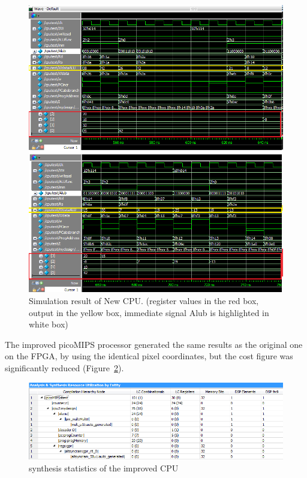 \begin{figure}[H]
		\centering
		\includegraphics[width = \textwidth]{Figures/icputest_2}		
		\caption{Simulation result of New CPU. (register values in the red box, output in the yellow box, immediate signal Alub is highlighted in white box)}
		\label {fig:icputest}
\end{figure}

The improved picoMIPS processor generated the same results as the original one on the FPGA, by using the identical pixel coordinates, but the cost figure was significantly reduced (Figure~\ref{fig:icpugood}).

\begin{figure}[H]
		\centering
		\includegraphics[width = \textwidth]{Figures/icpucost_1}		
		\caption{synthesis statistics of the improved CPU}
		\label {fig:icpugood}
\end{figure}